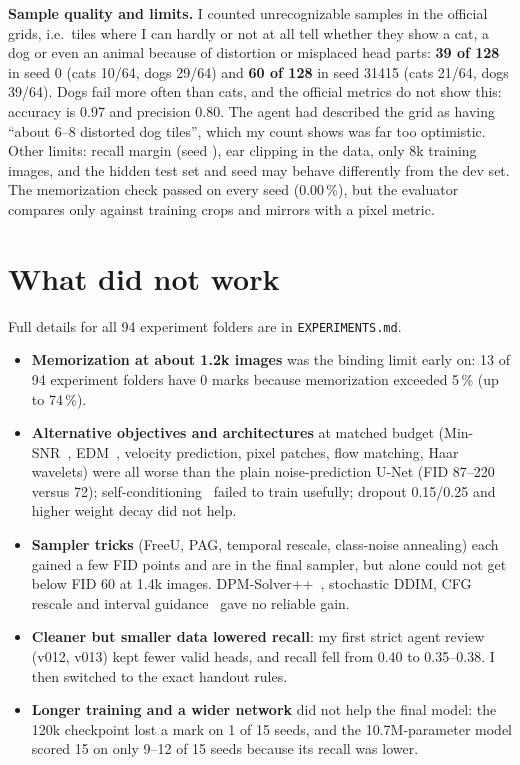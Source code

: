 \documentclass[10pt]{article}
\begin{document}
\textbf{Sample quality and limits.} I counted unrecognizable samples in the official grids, i.e.\ tiles where I can hardly or not at all tell whether they show a cat, a dog or even an animal because of distortion or misplaced head parts: \textbf{39 of 128} in seed 0 (cats 10/64, dogs 29/64) and \textbf{60 of 128} in seed 31415 (cats 21/64, dogs 39/64). Dogs fail more often than cats, and the official metrics do not show this: accuracy is 0.97 and precision 0.80. The agent had described the grid as having ``about 6--8 distorted dog tiles'', which my count shows was far too optimistic. Other limits: recall margin (seed \lowSeed{}), ear clipping in the data, only 8k training images, and the hidden test set and seed may behave differently from the dev set. The memorization check passed on every seed (0.00\,\%), but the evaluator compares only against training crops and mirrors with a pixel metric.

\section{What did not work}
Full details for all 94 experiment folders are in \texttt{EXPERIMENTS.md}.
\begin{itemize}
\item \textbf{Memorization at about 1.2k images} was the binding limit early on: 13 of 94 experiment folders have 0 marks because memorization exceeded 5\,\% (up to 74\,\%).
\item \textbf{Alternative objectives and architectures} at matched budget (Min-SNR~\cite{hang2023minsnr}, EDM~\cite{karras2022edm}, velocity prediction, pixel patches, flow matching, Haar wavelets) were all worse than the plain noise-prediction U-Net (FID 87--220 versus 72); self-conditioning~\cite{chen2023analogbits} failed to train usefully; dropout 0.15/0.25 and higher weight decay did not help.
\item \textbf{Sampler tricks} (FreeU, PAG, temporal rescale, class-noise annealing) each gained a few FID points and are in the final sampler, but alone could not get below FID 60 at 1.4k images. DPM-Solver++~\cite{lu2022dpmpp}, stochastic DDIM, CFG rescale and interval guidance~\cite{kynkaanniemi2024interval} gave no reliable gain.
\item \textbf{Cleaner but smaller data lowered recall}: my first strict agent review (v012, v013) kept fewer valid heads, and recall fell from 0.40 to 0.35--0.38. I then switched to the exact handout rules.
\item \textbf{Longer training and a wider network} did not help the final model: the 120k checkpoint lost a mark on 1 of 15 seeds, and the 10.7M-parameter model scored 15 on only 9--12 of 15 seeds because its recall was lower.
\end{itemize}
\end{document}
